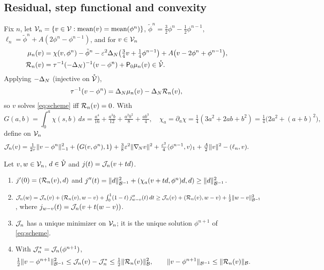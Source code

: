 \subsection{Residual, step functional and convexity}\label{sec:variational}
Fix $n$, let $\mathcal{V}_n=\{v\in\mathcal{V}:\operatorname{mean}(v)=\operatorname{mean}(\phi^n)\}$, $\tilde\phi^n=\frac32\phi^n-\frac12\phi^{n-1}$, $\ell_n=\tilde\phi^n+A(2\phi^n-\phi^{n-1})$, and for $v\in\mathcal{V}_n$
\begin{align}
\mu_n(v)&=\chi(v,\phi^n)-\tilde\phi^n-\varepsilon^2\Delta_N\big(\tfrac34v+\tfrac14\phi^{n-1}\big)+A\big(v-2\phi^n+\phi^{n-1}\big),\notag\\
\mathcal{R}_n(v)&=\tau^{-1}(-\Delta_N)^{-1}(v-\phi^n)+\mathsf{P}_0\mu_n(v)\in\mathring{\mathcal{V}} .\label{eq:residual}
\end{align}
Applying $-\Delta_N$ (injective on $\mathring{\mathcal{V}}$),
\begin{equation}\label{eq:perturbed-scheme}
\tau^{-1}(v-\phi^n)=\Delta_N\mu_n(v)-\Delta_N\mathcal{R}_n(v),
\end{equation}
so $v$ solves \eqref{eq:scheme} iff $\mathcal{R}_n(v)=0$. With
\begin{equation}\label{eq:G}
G(a,b)=\int_0^a\chi(s,b)\,ds=\tfrac{a^4}{16}+\tfrac{a^3b}{12}+\tfrac{a^2b^2}{8}+\tfrac{ab^3}{4},\quad \chi_a=\partial_a\chi=\tfrac14(3a^2+2ab+b^2)=\tfrac14\big(2a^2+(a+b)^2\big),
\end{equation}
define on $\mathcal{V}_n$
\begin{equation}\label{eq:J}
\mathcal{J}_n(v)=\tfrac1{2\tau}\lVert v-\phi^n\rVert_{-1}^2+\big(G(v,\phi^n),1\big)+\tfrac38\varepsilon^2\lVert \nabla_{\!N} v\rVert^2+\tfrac{\varepsilon^2}{4}\langle\phi^{n-1},v\rangle_1+\tfrac A2\lVert v\rVert^2-(\ell_n,v).
\end{equation}

\begin{proposition}\label{prop:convex}
Let $v,w\in\mathcal{V}_n$, $d\in\mathring{\mathcal{V}}$ and $j(t)=\mathcal{J}_n(v+td)$.
\begin{enumerate}
\item[(i)] $j'(0)=(\mathcal{R}_n(v),d)$ and $j''(t)=\lVert d\rVert_{\mathcal{B}^{-1}}^2+(\chi_a(v+td,\phi^n)d,d)\ge\lVert d\rVert_{\mathcal{B}^{-1}}^2$.
\item[(ii)] $\mathcal{J}_n(w)=\mathcal{J}_n(v)+(\mathcal{R}_n(v),w-v)+\int_0^1(1-t)\,j_{w-v}''(t)\,dt\ge\mathcal{J}_n(v)+(\mathcal{R}_n(v),w-v)+\frac12\lVert w-v\rVert_{\mathcal{B}^{-1}}^2$, where $j_{w-v}(t)=\mathcal{J}_n(v+t(w-v))$.
\item[(iii)] $\mathcal{J}_n$ has a unique minimizer on $\mathcal{V}_n$; it is the unique solution $\phi^{n+1}$ of \eqref{eq:scheme}.
\item[(iv)] With $\mathcal{J}_n^*=\mathcal{J}_n(\phi^{n+1})$,
\begin{equation}\label{eq:PL}
\tfrac12\lVert v-\phi^{n+1}\rVert_{\mathcal{B}^{-1}}^2\le\mathcal{J}_n(v)-\mathcal{J}_n^*\le\tfrac12\lVert \mathcal{R}_n(v)\rVert_{\mathcal{B}}^2,\qquad \lVert v-\phi^{n+1}\rVert_{\mathcal{B}^{-1}}\le\lVert \mathcal{R}_n(v)\rVert_{\mathcal{B}} .
\end{equation}
\end{enumerate}
\end{proposition}

